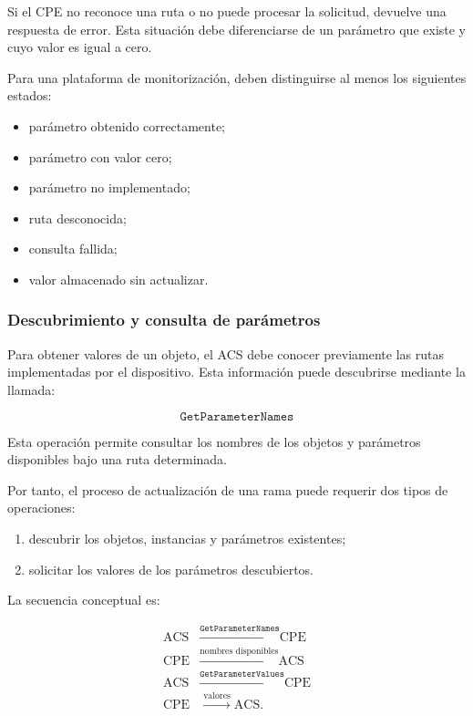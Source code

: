 Si el CPE no reconoce una ruta o no puede procesar la solicitud, devuelve
una respuesta de error. Esta situación debe diferenciarse de un parámetro
que existe y cuyo valor es igual a cero.

Para una plataforma de monitorización, deben distinguirse al menos los
siguientes estados:

\begin{itemize}
    \item parámetro obtenido correctamente;
    \item parámetro con valor cero;
    \item parámetro no implementado;
    \item ruta desconocida;
    \item consulta fallida;
    \item valor almacenado sin actualizar.
\end{itemize}


\subsubsection*{Descubrimiento y consulta de parámetros}

Para obtener valores de un objeto, el ACS debe conocer previamente las
rutas implementadas por el dispositivo. Esta información puede
descubrirse mediante la llamada:

\[
    \texttt{GetParameterNames}
\]

Esta operación permite consultar los nombres de los objetos y parámetros
disponibles bajo una ruta determinada.

Por tanto, el proceso de actualización de una rama puede requerir dos
tipos de operaciones:

\begin{enumerate}
    \item descubrir los objetos, instancias y parámetros existentes;

    \item solicitar los valores de los parámetros descubiertos.
\end{enumerate}

La secuencia conceptual es:

\[
\begin{aligned}
    \text{ACS}
    &\xrightarrow{\texttt{GetParameterNames}}
    \text{CPE}\\
    \text{CPE}
    &\xrightarrow{\text{nombres disponibles}}
    \text{ACS}\\
    \text{ACS}
    &\xrightarrow{\texttt{GetParameterValues}}
    \text{CPE}\\
    \text{CPE}
    &\xrightarrow{\text{valores}}
    \text{ACS}.
\end{aligned}
\]

